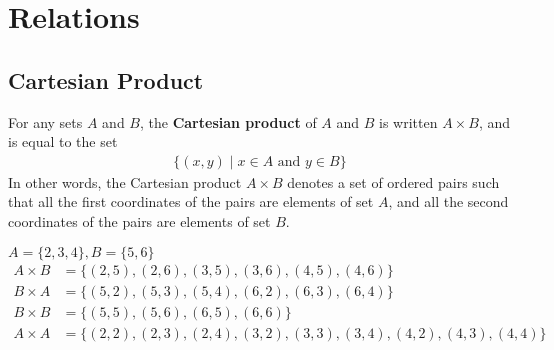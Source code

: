\documentclass[../notes.tex]{subfiles}
\begin{document}
	\chapter{Relations}
		\section{Cartesian Product}
			For any sets $A$ and $B$, the \textbf{Cartesian product} of $A$ and $B$ is written $A \times B$, and is equal to the set
			\begin{align*}
				\bigl\{(x, y) \mid x \in A \text{ and } y \in B\bigr\}
			\end{align*}
			In other words, the Cartesian product $A \times B$ denotes a set of ordered pairs such that all the first coordinates of the pairs are elements of set $A$, and all the second coordinates of the pairs are elements of set $B$.
			\begin{examplebox}
				$A = \{2, 3, 4\}, B = \{5, 6\}$
				\begin{align*}
					A \times B &= \bigl\{(2, 5), (2, 6), (3, 5), (3, 6), (4, 5), (4, 6)\bigr\}\\
					B \times A &= \bigl\{(5, 2), (5, 3), (5, 4), (6, 2), (6, 3), (6, 4)\bigr\}\\
					B \times B &= \bigl\{(5, 5), (5, 6), (6, 5), (6, 6)\bigr\}\\
					A \times A &= \bigl\{(2, 2), (2, 3), (2, 4), (3, 2), (3, 3), (3, 4), (4, 2), (4, 3), (4, 4)\bigr\}
				\end{align*}
			\end{examplebox}
\end{document}
